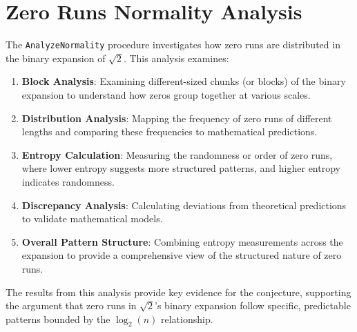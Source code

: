 \section{Zero Runs Normality Analysis}

The \texttt{AnalyzeNormality} procedure investigates how zero runs are distributed in the binary
expansion of $\sqrt{2}$. This analysis examines:
\begin{enumerate}
    \item \textbf{Block Analysis}: Examining different-sized chunks (or blocks) of the binary expansion to
    understand how zeros group together at various scales.
    \item \textbf{Distribution Analysis}: Mapping the frequency of zero runs of different lengths and
    comparing these frequencies to mathematical predictions.
    \item \textbf{Entropy Calculation}: Measuring the randomness or order of zero runs, where lower
    entropy suggests more structured patterns, and higher entropy indicates randomness.
    \item \textbf{Discrepancy Analysis}: Calculating deviations from theoretical predictions to validate
    mathematical models.
    \item \textbf{Overall Pattern Structure}: Combining entropy measurements across the expansion to
    provide a comprehensive view of the structured nature of zero runs.
\end{enumerate}

The results from this analysis provide key evidence for the conjecture, supporting the
argument that zero runs in $\sqrt{2}$’s binary expansion follow specific, predictable patterns
bounded by the $\log_2(n)$ relationship.

